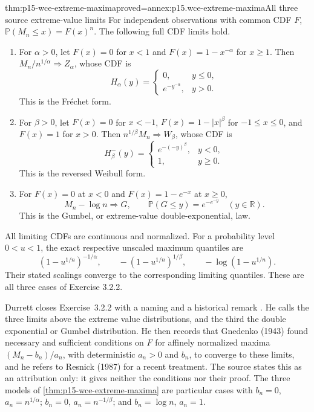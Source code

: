 \begin{hbtheorem}{thm:p15-wce-extreme-maxima}{proved=annex:p15.wce-extreme-maxima}{All three source extreme-value limits}
For independent observations with common CDF \(F\),
\(\mathbb P(M_n\leq x)=F(x)^n\). The following full CDF limits
hold.
\begin{enumerate}
\item For \(\alpha>0\), let \(F(x)=0\) for \(x<1\) and
 \(F(x)=1-x^{-\alpha}\) for \(x\geq1\). Then
 \(M_n/n^{1/\alpha}\Rightarrow Z_\alpha\), whose CDF is
 \[
  H_\alpha(y)=
  \begin{cases}0,&y\leq0,\\ e^{-y^{-\alpha}},&y>0.\end{cases}
 \]
 This is the Fr\'echet form.
\item For \(\beta>0\), let \(F(x)=0\) for \(x<-1\),
 \(F(x)=1-|x|^\beta\) for \(-1\leq x\leq0\), and
 \(F(x)=1\) for \(x>0\). Then \(n^{1/\beta}M_n\Rightarrow W_\beta\),
 whose CDF is
 \[
  H_\beta^-(y)=
  \begin{cases}e^{-(-y)^\beta},&y<0,\\1,&y\geq0.\end{cases}
 \]
 This is the reversed Weibull form.
\item For \(F(x)=0\) at \(x<0\) and \(F(x)=1-e^{-x}\)
 at \(x\geq0\),
 \[
  M_n-\log n\Rightarrow G,\qquad
  \mathbb P(G\leq y)=e^{-e^{-y}}\quad(y\in\mathbb R).
 \]
 This is the Gumbel, or extreme-value double-exponential, law.
\end{enumerate}
All limiting CDFs are continuous and normalized.
For a probability level \(0<u<1\), the exact respective
unscaled maximum quantiles are
\[
 (1-u^{1/n})^{-1/\alpha},\qquad
 -(1-u^{1/n})^{1/\beta},\qquad
 -\log(1-u^{1/n}).
 \]
Their stated scalings converge to the corresponding limiting
quantiles. These are all three cases of Exercise 3.2.2.
\end{hbtheorem}

Durrett closes Exercise~3.2.2 with a naming and a historical
remark \cite[p.~123]{DurrettPTEAuthor2019}. He calls the three
limits above the extreme value distributions, and the third the
double exponential or Gumbel distribution. He then records that
Gnedenko (1943) found necessary and sufficient conditions on \(F\)
for affinely normalized maxima \((M_n-b_n)/a_n\), with deterministic
\(a_n>0\) and \(b_n\), to converge to these limits, and he refers to
Resnick (1987) for a recent treatment. The source states this as an
attribution only: it gives neither the conditions nor their proof.
The three models of \cref{thm:p15-wce-extreme-maxima} are particular
cases with \(b_n=0\), \(a_n=n^{1/\alpha}\); \(b_n=0\),
\(a_n=n^{-1/\beta}\); and \(b_n=\log n\), \(a_n=1\).

